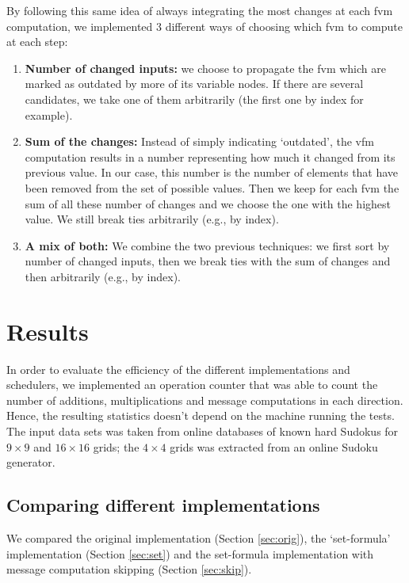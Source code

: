 \documentclass[a4paper,11pt]{report}
\begin{document}
By following this same idea of always integrating the most changes at each \ac{fvm} computation, we implemented 3 different ways of choosing which \ac{fvm} to compute at each step:
\begin{enumerate}
\item \textbf{Number of changed inputs:} we choose to propagate the \ac{fvm} which are marked as outdated by more of its variable nodes. If there are several candidates, we take one of them arbitrarily (the first one by index for example).
\item \textbf{Sum of the changes:} Instead of simply indicating `outdated', the \ac{vfm} computation results in a number representing how much it changed from its previous value. In our case, this number is the number of elements that have been removed from the set of possible values. Then we keep for each \ac{fvm} the sum of all these number of changes and we choose the one with the highest value. We still break ties arbitrarily (e.g., by index).
\item \textbf{A mix of both:} We combine the two previous techniques: we first sort by number of changed inputs, then we break ties with the sum of changes and then arbitrarily (e.g., by index).
\end{enumerate}


\section{Results}
\label{sec:results}

In order to evaluate the efficiency of the different implementations and schedulers, we implemented an operation counter that was able to count the number of additions, multiplications and message computations in each direction. Hence, the resulting statistics doesn't depend on the machine running the tests.
The input data sets was taken from online databases of known hard Sudokus for $9\times 9$\cite{magictour,gordon} and $16 \times 16$\cite{magictour} grids; the $4 \times 4$ grids was extracted from an online Sudoku generator\cite{sugen}.

\subsection{Comparing different implementations}
\label{sec:resimpl}

We compared the original implementation (Section \ref{sec:orig}), the `set-formula' implementation (Section \ref{sec:set}) and the set-formula implementation with message computation skipping (Section \ref{sec:skip}).
\end{document}
